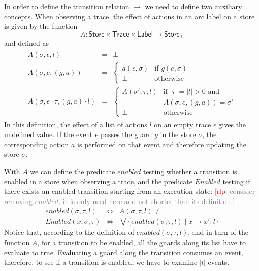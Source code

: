 \documentclass{sigplanconf}[10pt] %
\newcommand{\noterg}[2]{\textcolor{gray}{[\textcolor{red}{#1}: #2]}}
\newcommand{\rlp}[1]{\noterg{rlp}{#1}}
\newcommand{\set}[1]{\ensuremath{\mathsf{#1}}}
\begin{document}
In order to define the transition relation $\to$ we need to define two auxiliary concepts.
When observing a trace, the effect of actions in an arc label on a store  is given by the function
\[
   A : \set{Store} \times \set{Trace} \times \set{Label} \to \set{Store}_\bot
\] and defined as
\[
\begin{array}{l}
\begin{array}{lcl}
A(\sigma,\epsilon,l) & = & \bot
\\[2ex]
A(\sigma,e,(g,a)) & = & \left\{\begin{array}{ll}
     a(e,\sigma) & \mbox{if $g(e,\sigma)$}
     \\[1ex]
     \bot & \mbox{otherwise}
     \end{array}
     \right.
\\[5ex]
A(\sigma,e\cdot \tau,(g,a)\cdot l) & = & \left\{\begin{array}{ll}
     A(\sigma',\tau,l) & \mbox{if $|\tau|{=}|l|{>}0$ and }
     \\
& \mbox{$A(\sigma,e,(g,a)){=}\sigma'$}
     \\[1ex]
     \bot & \mbox{otherwise}
     \end{array}
     \right.
\end{array}
\end{array}\]
In this definition, the effect of a list of actions $l$ on an empty trace $\epsilon$ gives the undefined value.
If the event $e$ passes the guard $g$ in the store $\sigma$, the corresponding action $a$ is performed on that event and therefore updating the store $\sigma$.

With $A$ we can define the predicate $enabled$ testing whether a
transition is enabled in a store when observing a trace, and the
predicate $Enabled$ testing if there exists an enabled transition
starting from an execution state:
\rlp{consider removing $enabled$, it is only used here and not shorter
than its definition.}
\begin{eqnarray*}
enabled(\sigma,\tau,l) & \Leftrightarrow & A(\sigma,\tau,l) \neq \bot
\\
Enabled(x,\sigma,\tau) & \Leftrightarrow  & \bigvee \{ enabled(\sigma,\tau,l) \mid x \to x' : l \}
\end{eqnarray*}
Notice that, according to the definition of $enabled(\sigma,\tau,l)$, and in turn of the function $A$, for a transition to be enabled, all the guards along its list have to evaluate to true.
Evaluating a guard along the transition consumes an event, therefore, to see if a transition is enabled, we have to examine $|l|$ events.
\end{document}
